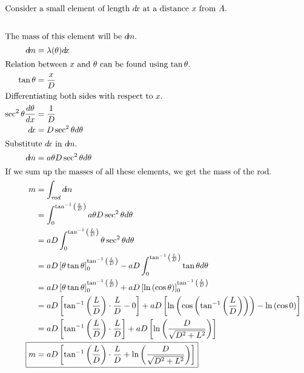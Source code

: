 \begin{enumerate}
\begin{center}
        \end{center}
        \begin{solution}
            \addtolength{\jot}{2em}
            \begin{align*}
                \intertext{Consider a small element of length $d\!x$ at a distance $x$ from $A$.}\\
                \intertext{The mass of this element will be $d\!m$.}
                d\!m &= \lambda(\theta) d\!x\\
                \intertext{Relation between $x$ and $\theta$ can be found using $\tan\theta$.}
                \tan\theta &= \frac{x}{D}\\
                \intertext{Differentiating both sides with respect to $x$.}
                \sec^2\theta \frac{d\theta}{dx} &= \frac{1}{D}\\
                d\!x &= D \sec^2\theta d\theta\\
                \intertext{Substitute $d\!x$ in $d\!m$.}
                d\!m &= a\theta D \sec^2\theta d\theta\\
                \intertext{If we sum up the masses of all these elements, we get the mass of the rod.}
                m &= \int_{\textit{rod}} d\!m\\
                &= \int_0^{\tan^{-1}{\left(\frac{L}{D}\right)}} a\theta D \sec^2\theta d\theta\\
                &= aD \int_0^{\tan^{-1}{\left(\frac{L}{D}\right)}} \theta \sec^2\theta d\theta\\
                &= aD \left[\theta \tan\theta\right]_0^{\tan^{-1}{\left(\frac{L}{D}\right)}} - aD \int_0^{\tan^{-1}{\left(\frac{L}{D}\right)}} \tan\theta d\theta\\
                &= aD \left[\theta \tan\theta\right]_0^{\tan^{-1}{\left(\frac{L}{D}\right)}} + aD \left[\ln\left(\cos\theta\right)\right]_0^{\tan^{-1}{\left(\frac{L}{D}\right)}}\\
                &= aD \left[\tan^{-1}{\left(\frac{L}{D}\right)} \cdot \frac{L}{D} - 0\right] + aD \left[\ln\left(\cos\left(\tan^{-1}{\left(\frac{L}{D}\right)}\right)\right) - \ln\left(\cos 0\right)\right]\\
                &= aD \left[\tan^{-1}{\left(\frac{L}{D}\right)} \cdot \frac{L}{D}\right] + aD \left[\ln\left(\frac{D}{\sqrt{D^2+L^2}}\right)\right]\\
                \Aboxed{m &= aD \left[\tan^{-1}{\left(\frac{L}{D}\right)} \cdot \frac{L}{D} + \ln\left(\frac{D}{\sqrt{D^2+L^2}}\right)\right]}
            \end{align*}
        \end{solution}
        \BgThispage
\end{enumerate}

